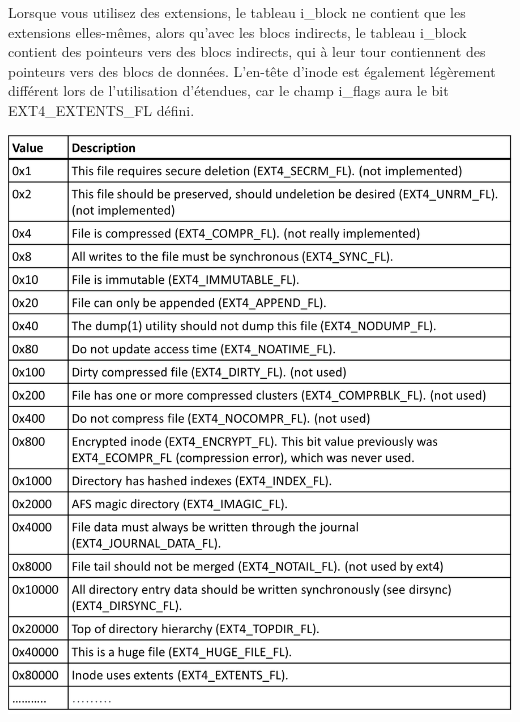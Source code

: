 \documentclass[12pt, letterpaper]{report}
\begin{document}
Lorsque vous utilisez des extensions, le tableau i\_block ne contient que les extensions elles-mêmes, alors qu'avec les blocs indirects, le tableau i\_block contient des pointeurs vers des blocs indirects, qui à leur tour contiennent des pointeurs vers des blocs de données. L'en-tête d'inode est également légèrement différent lors de l'utilisation d'étendues, car le champ i\_flags aura le bit EXT4\_EXTENTS\_FL défini.

\begin{center}
	\includegraphics[width=\textwidth]{inode_flags}
\end{center}
\end{document}
